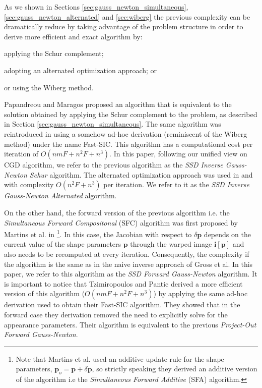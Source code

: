 As we shown in Sections \ref{sec:gauss_newton_simultaneous}, \ref{sec:gauss_newton_alternated} and \ref{sec:wiberg} the previous complexity can be dramatically reduce by taking advantage of the problem structure in order to derive more efficient and exact algorithm by:
\begin{inparaenum}
\item applying the Schur complement;
\item adopting an alternated optimization approach; or
\item or using the Wiberg method.
\end{inparaenum}
Papandreou and Maragos \cite{Papandreou2008} proposed an algorithm that is equivalent to the solution obtained by applying the Schur complement to the problem, as described in Section \ref{sec:gauss_newton_simultaneous}. The same algorithm was reintroduced in \cite{Tzimiropoulos2013} using a somehow ad-hoc derivation (reminiscent of the Wiberg method) under the name Fast-SIC. This algorithm has a computational cost per iteration of $O(nmF + n^2F + n^3)$. In this paper, following our unified view on CGD algorithm, we refer to the previous algorithm as the \emph{SSD Inverse Gauss-Newton Schur} algorithm. The alternated optimization approach was used in \cite{Tzimiropoulos2012} and \cite{Antonakos2014} with complexity $O(n^2F + n^3)$ per iteration. We refer to it as the \emph{SSD Inverse Gauss-Newton Alternated} algorithm.

On the other hand, the forward version of the previous algorithm i.e. the \emph{Simultaneous Forward Compositonal} (SFC) algorithm was first proposed by Martins et al. in \cite{Martins2010}\footnote{Note that Martins et al.  used an additive update rule for the shape parameters, $\mathbf{p}_o =  \mathbf{p} + \delta\mathbf{p}$, so strictly speaking they derived an additive version of the algorithm i.e the \emph{Simultaneous Forward Additive} (SFA) algorithm.}. In this case, the Jacobian with respect to $\delta\mathbf{p}$ depends on the current value of the shape parameters $\mathbf{p}$ through the warped image $\mathbf{i}[\mathbf{p}]$ and also needs to be recomputed at every iteration. Consequently, the complexity if the algorithm is the same as in the naive inverse approach of Gross et al. In this paper, we refer to this algorithm as the \emph{SSD Forward Gauss-Newton} algorithm. It is important to notice that Tzimiropoulos and Pantic \cite{Tzimiropoulos2013} derived a more efficient version of this algorithm ($O(nmF + n^2F + n^3)$) by applying the same ad-hoc derivation used to obtain their Fast-SIC algorithm. They showed that in the forward case they derivation removed the need to explicitly solve for the appearance parameters. Their algorithm is equivalent to the previous \emph{Project-Out Forward Gauss-Newton}.

